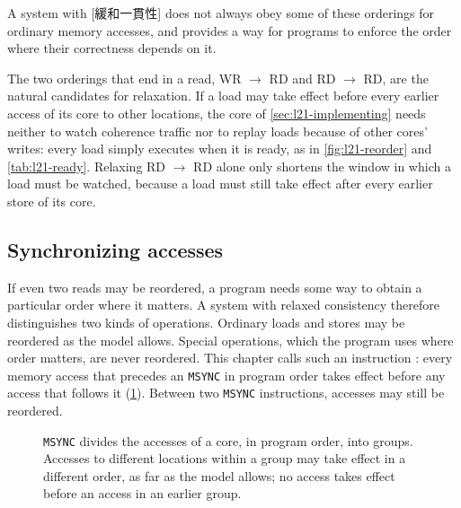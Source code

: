 \documentclass[../main.tex]{subfiles}
\begin{document}
\begin{definition}
  A system with [緩和一貫性] does not always obey
  some of these orderings for ordinary memory accesses, and provides a way for
  programs to enforce the order where their correctness depends on it.
\end{definition}

The two orderings that end in a read, WR $\to$ RD and RD $\to$ RD, are the
natural candidates for relaxation.  If a load may take effect before every
earlier access of its core to other locations, the core of
\cref{sec:l21-implementing} needs neither to watch coherence traffic nor to
replay loads because of other cores' writes: every load simply executes when
it is ready, as in \cref{fig:l21-reorder} and \cref{tab:l21-ready}.
Relaxing RD $\to$ RD alone only shortens the window in which a load must be
watched, because a load must still take effect after every earlier store of
its core.

\subsection{Synchronizing accesses}

If even two reads may be reordered, a program needs some way to obtain a
particular order where it matters.  A system with relaxed consistency
therefore distinguishes two kinds of operations.  Ordinary loads and stores
may be reordered as the model allows.  Special operations, which the program
uses where order matters, are never reordered.  This chapter calls such an
instruction : every memory access that precedes an
\texttt{MSYNC} in program order takes effect before any access that follows it
(\cref{fig:l21-msync}).  Between two \texttt{MSYNC} instructions, accesses
may still be reordered.

\begin{figure}[htbp]
  \centering
  
  \caption{\texttt{MSYNC} divides the accesses of a core, in program order,
    into groups.  Accesses to different locations within a group may take
    effect in a different order, as far as the model allows; no access takes
    effect before an access in an earlier group.}
  \label{fig:l21-msync}
\end{figure}
\end{document}
